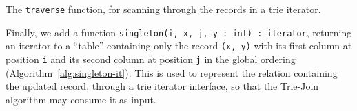 \begin{algorithm}

  \caption{The \texttt{traverse} function, for scanning through the records in a
    trie iterator.}\label{alg:traverse}
\end{algorithm}

Finally, we add a function \texttt{singleton(i, x, j, y\,:\,int)\,:\,iterator}, returning an iterator to a ``table'' containing only the record \texttt{(x, y)} with its first column at position \texttt{i} and its second column at position \texttt{j} in the global ordering (Algorithm~\ref{alg:singleton-it}). This is used to represent the relation containing the updated record, through a trie iterator interface, so that the Trie-Join algorithm may consume it as input.\\[1em]

